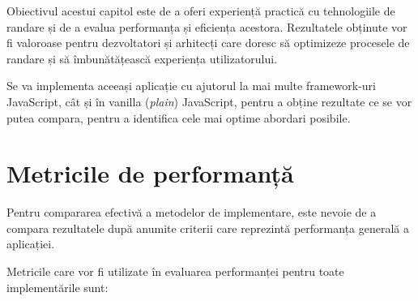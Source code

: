 \documentclass[12pt, a4paper]{report}
\begin{document}
Obiectivul acestui capitol este de a oferi experiență practică cu tehnologiile de randare și de a evalua performanța și eficiența acestora. Rezultatele obținute vor fi valoroase pentru dezvoltatori și arhitecți care doresc să optimizeze procesele de randare și să îmbunătățească experiența utilizatorului.

Se va implementa aceeași aplicație cu ajutorul la mai multe framework-uri JavaScript, cât și în vanilla (\emph{plain}) JavaScript, pentru a obține rezultate ce se vor putea compara, pentru a identifica cele mai optime abordari posibile.


\section{Metricile de performanță}

Pentru compararea efectivă a metodelor de implementare, este nevoie de a compara rezultatele după anumite criterii care reprezintă performanța generală a aplicației.

Metricile care vor fi utilizate în evaluarea performanței pentru toate implementările sunt:
\end{document}
